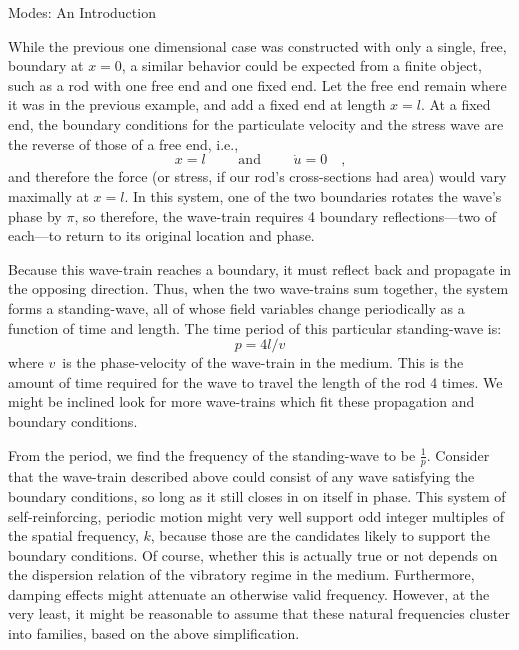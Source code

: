\documentclass[a4paper,10pt]{report}
\numberwithin{equation}{section}
\begin{document}
{\begin{chapter}
\begin{section}{Modes: An Introduction}
\par
While the previous one dimensional case was constructed with only a single, free, boundary at $x=0$, a similar behavior could be expected from a finite object, such as a rod with one free end and one fixed end. Let the free end remain where it was in the previous example, and add a fixed end at length $x=l$. At a fixed end, the boundary conditions for the particulate velocity and the stress wave are the reverse of those of a free end, i.e., 
\begin{equation*}
x=l \qquad \text{ and } \qquad \dot{u} = 0 \quad \text{,}
\end{equation*}
and therefore the force (or stress, if our rod's cross-sections had area) would vary maximally at $x=l$. In this system, one of the two boundaries rotates the wave's phase by $\pi$, so therefore, the wave-train requires 4 boundary reflections---two of each---to return to its original location and phase.
\par
Because this wave-train reaches a boundary, it must reflect back and propagate in the opposing direction. Thus, when the two wave-trains sum together, the system forms a standing-wave, all of whose field variables change periodically as a function of time and length.\cite[p.~117]{Cremer1973} The time period of this particular standing-wave is:
\begin{equation}
p = 4l / v
\end{equation}
where $v$\  is the phase-velocity of the wave-train in the medium. This is the amount of time required for the wave to travel the length of the rod 4 times. We might be inclined look for more wave-trains which fit these propagation and boundary conditions.\cite[p.117]{Cremer1973} 
\par
From the period, we find the frequency of the standing-wave to be $\frac{1}{p}$. Consider that the wave-train described above could consist of any wave satisfying the boundary conditions, so long as it still closes in on itself in phase. This system of self-reinforcing, periodic motion might very well support odd integer multiples of the spatial frequency, $k$, because those are the candidates likely to support the boundary conditions. Of course, whether this is actually true or not depends on the dispersion relation of the vibratory regime in the medium. Furthermore, damping effects might attenuate an otherwise valid frequency. However, at the very least, it might be reasonable to assume that these natural frequencies cluster into families, based on the above simplification.\cite[p.~126]{Cremer1973}

\end{section}
\end{chapter}}
\end{document}
